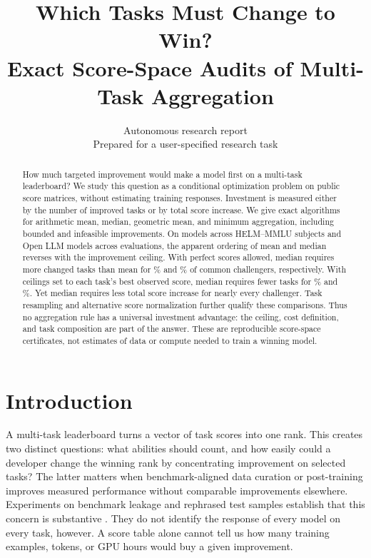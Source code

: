 \documentclass{article}
\title{Which Tasks Must Change to Win?\\Exact Score-Space Audits of Multi-Task Aggregation}
\author{Autonomous research report\\Prepared for a user-specified research task}
\begin{document}
\maketitle
\begin{abstract}
How much targeted improvement would make a model first on a multi-task leaderboard?
We study this question as a conditional optimization problem on public score matrices,
without estimating training responses. Investment is measured either by the number
of improved tasks or by total score increase. We give exact algorithms for arithmetic
mean, median, geometric mean, and minimum aggregation, including bounded and
infeasible improvements. On \HelmN{} models across \HelmD{} HELM--MMLU subjects
and \OllN{} Open LLM models across \OllD{} evaluations, the apparent ordering of
mean and median reverses with the improvement ceiling. With perfect scores allowed,
median requires more changed tasks than mean for \HelmUnitMedMore\% and
\OllUnitMedMore\% of common challengers, respectively. With ceilings set to each
task's best observed score, median requires fewer tasks for \HelmObservedMedLess\%
and \OllObservedMedLess\%. Yet median requires less total score increase for nearly
every challenger. Task resampling and alternative score normalization further qualify
these comparisons. Thus no aggregation rule has a universal investment advantage:
the ceiling, cost definition, and task composition are part of the answer.
These are reproducible score-space certificates, not estimates of data or compute
needed to train a winning model.
\end{abstract}

\section{Introduction}
\label{sec:intro}
A multi-task leaderboard turns a vector of task scores into one rank. This creates
two distinct questions: what abilities should count, and how easily could a developer
change the winning rank by concentrating improvement on selected tasks? The latter
matters when benchmark-aligned data curation or post-training improves measured
performance without comparable improvements elsewhere. Experiments on benchmark
leakage and rephrased test samples establish that this concern is substantive
\citep{zhou2023cheater,yang2023rephrased}. They do not identify the response of every
model on every task, however. A score table alone cannot tell us how many training
examples, tokens, or GPU hours would buy a given improvement.
\end{document}
